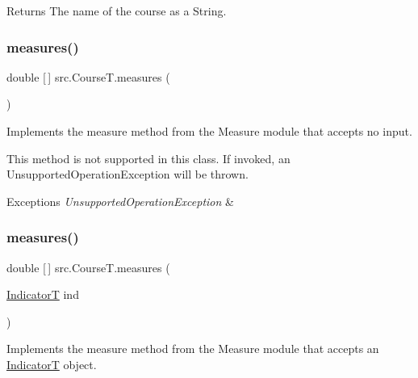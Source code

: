 \begin{DoxyReturn}{Returns}
The name of the course as a String. 
\end{DoxyReturn}
\mbox{\label{classsrc_1_1CourseT_aa9abf592dff159aa10f74a7342296351}} 
\subsubsection{\texorpdfstring{measures()}{measures()}\hspace{0.1cm}{\footnotesize\ttfamily [1/3]}}
{\footnotesize\ttfamily double \mbox{[}$\,$\mbox{]} src.\+Course\+T.\+measures (\begin{DoxyParamCaption}{ }\end{DoxyParamCaption})}



Implements the measure method from the Measure module that accepts no input. 

This method is not supported in this class. If invoked, an Unsupported\+Operation\+Exception will be thrown. 
\begin{DoxyExceptions}{Exceptions}
{\em Unsupported\+Operation\+Exception} & \\
\hline
\end{DoxyExceptions}
\mbox{\label{classsrc_1_1CourseT_ac81d229c59608e1848f077e9ac61d381}} 
\subsubsection{\texorpdfstring{measures()}{measures()}\hspace{0.1cm}{\footnotesize\ttfamily [2/3]}}
{\footnotesize\ttfamily double \mbox{[}$\,$\mbox{]} src.\+Course\+T.\+measures (\begin{DoxyParamCaption}\item[{\hyperlink{enumsrc_1_1IndicatorT}{IndicatorT}}]{ind }\end{DoxyParamCaption})}



Implements the measure method from the Measure module that accepts an \hyperlink{enumsrc_1_1IndicatorT}{IndicatorT} object. 


